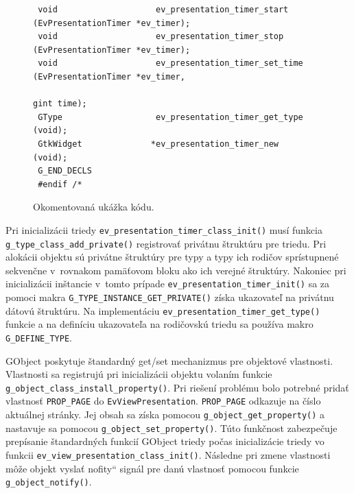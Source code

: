 \documentclass[12pt,oneside,final]{fithesis2}
\newcommand\uv[1]{\quotedblbase #1\textquotedblleft}%
\begin{document}
\begin{figure}[hb]
\begin{tiny}
\begin{verbatim}
 void                    ev_presentation_timer_start             (EvPresentationTimer *ev_timer);
 void                    ev_presentation_timer_stop              (EvPresentationTimer *ev_timer);
 void                    ev_presentation_timer_set_time          (EvPresentationTimer *ev_timer,
                                                                  gint time);
 GType                   ev_presentation_timer_get_type          (void);
 GtkWidget              *ev_presentation_timer_new               (void);
 G_END_DECLS
 #endif /*
\end{verbatim}
\end{tiny}
\caption{Okomentovaná ukážka kódu.}
\label{ev-presentation-timer.h}
\end{figure}

Pri inicializácii triedy \texttt{ev\_presentation\_timer\_class\_init()} musí funkcia \texttt{g\_type\_class\_add\_private()} registrovať privátnu štruktúru pre triedu\cite{gprivate}. Pri alokácii objektu sú privátne štruktúry pre typy a typy ich rodičov sprístupnené sekvenčne v~rovnakom pamäťovom bloku ako ich verejné štruktúry. Nakoniec pri inicializácii inštancie v~tomto prípade \texttt{ev\_presentation\_timer\_init()} sa za pomoci makra \texttt{G\_TYPE\_INSTANCE\_GET\_PRIVATE()} získa ukazovateľ na privátnu dátovú štruktúru. Na implementáciu \texttt{ev\_presentation\_timer\_get\_type()} funkcie a na definíciu ukazovateľa na rodičovskú triedu sa používa makro \texttt{G\_DEFINE\_TYPE}.

GObject poskytuje štandardný get/set mechanizmus pre objektové vlastnosti. Vlastnosti sa registrujú pri inicializácii objektu volaním funkcie \texttt{g\_object\_class\_install\_property()}. Pri riešení problému bolo potrebné pridať vlastnosť \texttt{PROP\_PAGE} do \texttt{EvViewPresentation}. \texttt{PROP\_PAGE} odkazuje na číslo aktuálnej stránky. Jej obsah sa získa pomocou \texttt{g\_object\_get\_property()} a nastavuje sa pomocou \texttt{g\_object\_set\_property()}. Túto funkčnost zabezpečuje prepísanie štandardných funkcií GObject triedy počas inicializácie triedy vo funkcii \texttt{ev\_view\_presentation\_class\_init()}. Následne pri zmene vlastnosti môže objekt vyslať \uv{nofity} signál pre danú vlastnosť pomocou funkcie \texttt{g\_object\_notify()}.
\end{document}
